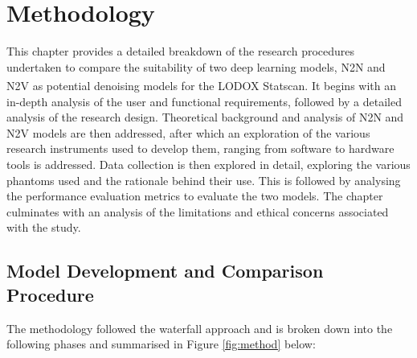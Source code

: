 
\glsresetall %
\chapter[Methodology]{Methodology}\label{ch:Methodology}


This chapter provides a detailed breakdown of the research procedures undertaken to compare the suitability of two deep learning models, \gls{N2N} and \gls{N2V} as potential denoising models for the  LODOX\textsuperscript{\textregistered} Statscan\textsuperscript{\textregistered}. It begins with an in-depth analysis of the user and functional requirements, followed by a detailed analysis of the research design. Theoretical background and analysis of \gls{N2N} and \gls{N2V} models are then addressed, after which an exploration of the various research instruments used to develop them, ranging from software to hardware tools is addressed. Data collection is then explored in detail, exploring the various phantoms used and the rationale behind their use. This is followed by analysing the performance evaluation metrics to evaluate the two models. The chapter culminates with an analysis of the limitations and ethical concerns associated with the study. 

\section{Model Development and Comparison Procedure}
The methodology followed the waterfall approach and is broken down into the following phases and summarised in Figure \ref{fig:method} below:

